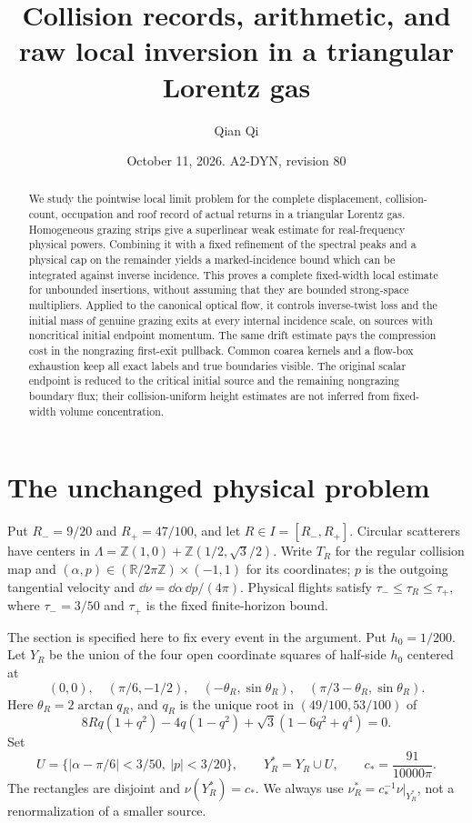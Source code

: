 \documentclass[11pt,reqno]{amsart}
\title[Collision records and raw local inversion]{Collision records, arithmetic, and raw local inversion in a triangular Lorentz gas}
\author{Qian Qi}
\date{October 11, 2026. A2-DYN, revision 80}
\numberwithin{equation}{section}
\theoremstyle{definition}
\theoremstyle{remark}\newtheorem{remark}[theorem]{Remark}
\newcommand{\R}{\mathbb R}\newcommand{\Z}{\mathbb Z}
\begin{document}
\raggedbottom
\begin{abstract}
We study the pointwise local limit problem for the complete displacement,
collision-count, occupation and roof record of actual returns in a
triangular Lorentz gas. Homogeneous grazing strips give a superlinear
weak estimate for real-frequency physical powers. Combining it with
a fixed refinement of the spectral peaks and a physical cap on the
remainder yields a marked-incidence bound which can be integrated
against inverse incidence. This proves a complete fixed-width local
estimate for unbounded insertions, without assuming that they are
bounded strong-space multipliers. Applied to the canonical optical
flow, it controls inverse-twist loss and the initial mass of genuine
grazing exits at every internal incidence scale, on sources with
noncritical initial endpoint momentum. The same drift estimate pays
the compression cost in the nongrazing first-exit pullback. Common
coarea kernels and a flow-box exhaustion keep all exact labels and
true boundaries visible. The original scalar endpoint is reduced to
the critical initial source and the remaining nongrazing boundary
flux; their collision-uniform height estimates are not inferred from
fixed-width volume concentration.
\end{abstract}
\maketitle

\section{The unchanged physical problem}
Put $R_-=9/20$ and $R_+=47/100$, and let $R\in I=[R_-,R_+]$. Circular scatterers have centers in
$\Lambda=\Z(1,0)+\Z(1/2,\sqrt3/2)$. Write $T_R$ for the regular
collision map and $(\alpha,p)\in(\R/2\pi\Z)\times(-1,1)$ for its
coordinates; $p$ is the outgoing tangential velocity and
$\dd\nu=\dd\alpha\,\dd p/(4\pi)$. Physical flights satisfy
$\tau_-\le\tau_R\le\tau_+$, where $\tau_-=3/50$ and $\tau_+$
is the fixed finite-horizon bound.

The section is specified here to fix every event in the argument.
Put $h_0=1/200$. Let $Y_R$ be the union of the four open coordinate
squares of half-side $h_0$ centered at
\[
 (0,0),\quad(\pi/6,-1/2),\quad
 (-\theta_R,\sin\theta_R),\quad
 (\pi/3-\theta_R,\sin\theta_R).
\]
Here $\theta_R=2\arctan q_R$, and $q_R$ is the unique root in
$(49/100,53/100)$ of
\[
 8Rq(1+q^2)-4q(1-q^2)+\sqrt3(1-6q^2+q^4)=0.
\]
Set
\[
 U=\{|\alpha-\pi/6|<3/50,\ |p|<3/20\},\qquad
 Y_R^*=Y_R\cup U,\qquad c_*=\frac{91}{10000\pi}.
\]
The rectangles are disjoint and $\nu(Y_R^*)=c_*$. We always use
$\nu_R^*=c_*^{-1}\nu|_{Y_R^*}$, not a renormalization of a smaller
source.
\end{document}
